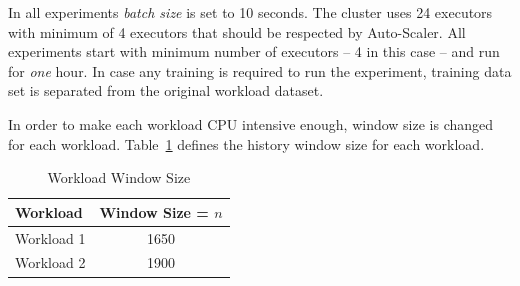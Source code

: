 In all experiments \emph{batch size} is set to 10 seconds. The cluster uses 24 executors with minimum of 4 executors that should be respected by Auto-Scaler. All experiments start with minimum number of executors -- 4 in this case -- and run for \emph{one} hour. In case any training is required to run the experiment, training data set is separated from the original workload dataset.

In order to make each workload CPU intensive enough, window size is changed for each workload. Table~\ref{eval:tab:history} defines the history window size for each workload.
\begin{table}[h]
    \begin{tabular}{lc}
        \toprule
        \textbf{Workload} & \textbf{Window Size = $n$ }\\
        \midrule
        Workload 1 & 1650\\
        Workload 2 & 1900\\
        \bottomrule
    \end{tabular}
    \centering
    \caption{Workload Window Size}
    \label{eval:tab:history}
\end{table}

\clearpage
